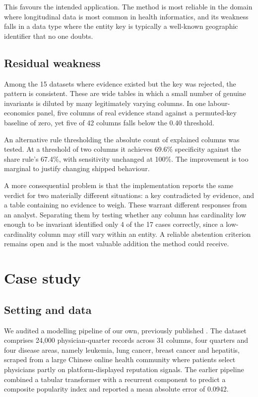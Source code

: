 \documentclass[preprint,12pt]{elsarticle}
\begin{document}
This favours the intended application. The method is most reliable in the domain
where longitudinal data is most common in health informatics, and its weakness
falls in a data type where the entity key is typically a well-known geographic
identifier that no one doubts.

\subsection{Residual weakness}

Among the 15 datasets where evidence existed but the key was rejected, the
pattern is consistent. These are wide tables in which a small number of genuine
invariants is diluted by many legitimately varying columns. In one
labour-economics panel, five columns of real evidence stand against a
permuted-key baseline of zero, yet five of 42 columns falls below the 0.40
threshold.

An alternative rule thresholding the absolute count of explained columns was
tested. At a threshold of two columns it achieves 69.6\% specificity against the
share rule's 67.4\%, with sensitivity unchanged at 100\%. The improvement is too
marginal to justify changing shipped behaviour.

A more consequential problem is that the implementation reports the same verdict
for two materially different situations: a key contradicted by evidence, and a
table containing no evidence to weigh. These warrant different responses from an
analyst. Separating them by testing whether any column has cardinality low
enough to be invariant identified only 4 of the 17 cases correctly, since a
low-cardinality column may still vary within an entity. A reliable abstention
criterion remains open and is the most valuable addition the method could
receive.

\section{Case study}

\subsection{Setting and data}

We audited a modelling pipeline of our own, previously published \cite{prior}.
The dataset comprises 24{,}000 physician-quarter records across 31 columns, four
quarters and four disease areas, namely leukemia, lung cancer, breast cancer and
hepatitis, scraped from a large Chinese online health community where patients
select physicians partly on platform-displayed reputation signals. The earlier
pipeline combined a tabular transformer with a recurrent component to predict a
composite popularity index and reported a mean absolute error of 0.0942.
\end{document}

